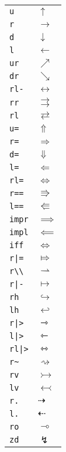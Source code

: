 \begin{longtable}{ll}
\texttt{u}&${}\uparrow {}$\\
\texttt{r}&${}\rightarrow {}$\\
\texttt{d}&${}\downarrow {}$\\
\texttt{l}&${}\leftarrow {}$\\
\texttt{ur}&${}\nearrow {}$\\
\texttt{dr}&${}\searrow {}$\\
\texttt{rl{-}}&${}\leftrightarrow {}$\\
\texttt{rr}&${}\rightrightarrows {}$\\
\texttt{rl}&${}\rightleftarrows {}$\\
\texttt{u=}&${}\Uparrow {}$\\
\texttt{r=}&${}\Rightarrow {}$\\
\texttt{d=}&${}\Downarrow {}$\\
\texttt{l=}&${}\Leftarrow {}$\\
\texttt{rl=}&${}\Leftrightarrow {}$\\
\texttt{r==}&${}\Rrightarrow {}$\\
\texttt{l==}&${}\Lleftarrow {}$\\
\texttt{impr}&${}\implies {}$\\
\texttt{impl}&${}\impliedby {}$\\
\texttt{iff}&${}\iff {}$\\
\texttt{r|=}&${}\Mapsto {}$\\
\texttt{r\textbackslash \textbackslash }&${}\rightharpoonup {}$\\
\texttt{r|{-}}&${}\mapsto {}$\\
\texttt{rh}&${}\hookrightarrow {}$\\
\texttt{lh}&${}\hookleftarrow {}$\\
\texttt{r|>}&${}\rightarrowtriangle {}$\\
\texttt{l|>}&${}\leftarrowtriangle {}$\\
\texttt{rl|>}&${}\leftrightarrowtriangle {}$\\
\texttt{r\textasciitilde }&${}\rightsquigarrow {}$\\
\texttt{rv}&${}\rightarrowtail {}$\\
\texttt{lv}&${}\leftarrowtail {}$\\
\texttt{r.}&${}\dashrightarrow {}$\\
\texttt{l.}&${}\dashleftarrow {}$\\
\texttt{ro}&${}\multimap {}$\\
\texttt{zd}&${}\lightning {}$\\

\end{longtable}
